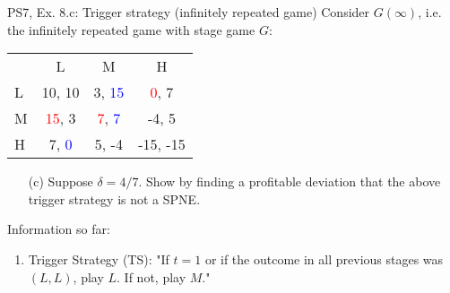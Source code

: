 \begin{frame}{PS7, Ex. 8.c: Trigger strategy (infinitely repeated game)}
    Consider $G(\infty)$, i.e. the infinitely repeated game with stage game $G$: \vspace{-6pt}
    \begin{table}
      \begin{tabular}{l|c|c|c|}
        \multicolumn{1}{c}{} & \multicolumn{1}{c}{L} & \multicolumn{1}{c}{M} & \multicolumn{1}{c}{H} \\\cline{2-4}
        L & 10, 10 & 3, \textcolor{blue}{15} & \textcolor{red}{0}, 7 \\\cline{2-4}
        M & \textcolor{red}{15}, 3 & \textcolor{red}{7}, \textcolor{blue}{7} & -4, 5 \\\cline{2-4}
        H & 7, \textcolor{blue}{0} & 5, -4 & -15, -15 \\\cline{2-4}
      \end{tabular}
    \end{table}
    \begin{itemize}
      \vspace{-4pt} \item[(c)] Suppose $\delta = 4/7$. Show by finding a profitable deviation that the above trigger strategy is not a SPNE. \vspace{-6pt}
    \end{itemize}
    \begin{multicols}{2}
      \vfill\null\columnbreak
      Information so far:
      \begin{enumerate}
        \item Trigger Strategy (TS): "If $t=1$ or if the outcome in all previous stages was $(L,L)$, play $L$. If not, play $M$."
      \end{enumerate}
      \vfill\null
    \end{multicols}
\end{frame}
